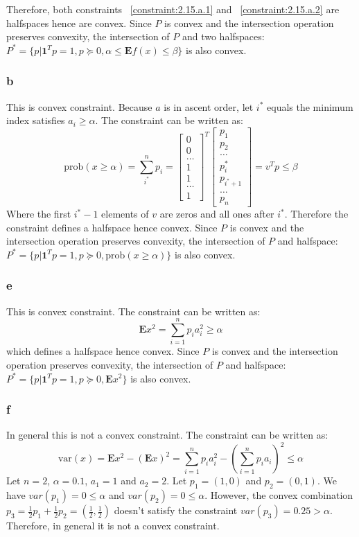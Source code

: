 \documentclass[10pt,a4paper]{article}
\begin{document}
Therefore, both constraints ~\ref{constraint:2.15.a.1} and ~\ref{constraint:2.15.a.2} are halfspaces hence are convex. Since $P$ is convex and the intersection operation preserves convexity, the intersection of $P$ and two halfspaces: $P^*=\{p|\mathbf{1}^Tp=1, p\succeq0, \alpha \leq \mathbf{E}f(x)\leq \beta\}$ is also convex.

\subsubsection{b}
This is convex constraint. Because $a$ is in ascent order, let $i^*$ equals the minimum index satisfies $a_i\geq \alpha$. The constraint can be written as:
$$
\text{prob}(x\geq \alpha)=\sum_{i^*}^np_i=\begin{bmatrix}
0\\
0\\
\dots\\
1\\
1\\
\dots\\
1
\end{bmatrix}^T
\begin{bmatrix}
p_1\\
p_2\\
\dots\\
p_i^*\\
p_{i^*+1}\\
\dots\\
p_n
\end{bmatrix}=v^Tp\leq \beta
$$
Where the first $i^*-1$ elements of $v$ are zeros and all ones after $i^*$. Therefore the constraint defines a halfspace hence convex. Since $P$ is convex and the intersection operation preserves convexity, the intersection of $P$ and halfspace: $P^*=\{p|\mathbf{1}^Tp=1, p\succeq0, \text{prob}(x\geq \alpha)\}$ is also convex.

\subsubsection{e}
This is convex constraint. The constraint can be written as:
$$
\mathbf{E}x^2=\sum_{i=1}^{n}p_ia_i^2\geq \alpha
$$
which defines a halfspace hence convex. Since $P$ is convex and the intersection operation preserves convexity, the intersection of $P$ and halfspace: $P^*=\{p|\mathbf{1}^Tp=1, p\succeq0, \mathbf{E}x^2\}$ is also convex.

\subsubsection{f}
In general this is not a convex constraint. The constraint can be written as:
$$
\text{var}(x)=\mathbf{E}x^2-(\mathbf{E}x)^2=\sum_{i=1}^{n}p_ia_i^2 - (\sum_{i=1}^{n}p_ia_i)^2\leq\alpha
$$
Let $n=2$, $\alpha=0.1$, $a_1=1$ and $a_2=2$. Let $p_1=(1,0)$ and $p_2=(0,1)$. We have $var(p_1)=0\leq\alpha$ and $var(p_2)=0\leq\alpha$. However, the convex combination $p_3 = \frac{1}{2}p_1+\frac{1}{2}p_2=(\frac{1}{2},\frac{1}{2})$ doesn't satisfy the constraint $var(p_3)=0.25>\alpha$. Therefore, in general it is not a convex constraint.
\end{document}
